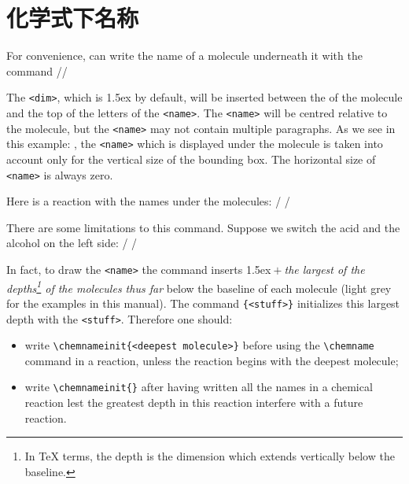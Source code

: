 \documentclass[10pt]{article}
\begin{document}
\section{化学式下名称}\label{chemname}
For convenience, \CF can write the name of a molecule underneath it with the command\idx*\chemname
\centerverb//
\smallskip

The \verb-<dim>-, which is 1.5ex by default, will be inserted between the  of the molecule and the top of the letters of the \verb-<name>-. The \verb-<name>- will be centred relative to the molecule, but the \verb-<name>- may not contain multiple paragraphs. As we see in this example: , the \verb-<name>- which is displayed under the molecule is taken into account only for the vertical size of the bounding box. The horizontal size of \verb-<name>- is always zero.

Here is a reaction with the names under the molecules:
/
\chemsign{+}
\chemrel{->}
\chemsign{+}
/

There are some limitations to this command. Suppose we switch the acid and the alcohol on the left side:
/
\chemsign{+}
\chemrel{->}
\chemsign{+}
/

In fact, to draw the \verb-<name>- the command \idx{\chemname} inserts 1.5ex${}+{}$\emph{the largest of the depths\footnote{In \TeX{} terms, the depth is the dimension which extends vertically below the baseline.} of the molecules thus far} below the baseline of each molecule (light grey for the examples in this manual). The command \idx{\chenameinit}\verb-{<stuff>}- initializes this largest depth with the \verb-<stuff>-. Therefore one should:
\begin{itemize}
	\item write \verb-\chemnameinit{<deepest molecule>}- before using the \verb-\chemname- command in a reaction, unless the reaction begins with the deepest molecule;
	\item write \verb-\chemnameinit{}- after having written all the names in a chemical reaction lest the greatest depth in this reaction interfere with a future reaction.
\end{itemize}
\end{document}
